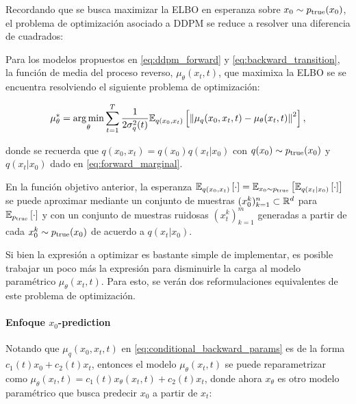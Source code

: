 Recordando que se busca maximizar la ELBO en esperanza sobre $x_0\sim p_{\operatorname{true}}(x_0)$, el problema de optimización asociado a DDPM se reduce a resolver una diferencia de cuadrados:

\begin{prop}
    \label{prop:mu_prediction}

    Para los modelos propuestos en \eqref{eq:ddpm_forward} y \eqref{eq:backward_transition}, la función de media del proceso reverso, $\mu_\theta(x_t,t)$, que maximixa la ELBO se se encuentra resolviendo el siguiente problema de optimización:

    \begin{equation*}
        \mu_\theta^* = \operatorname*{arg\,min}_{\theta} \sum_{t=1}^T \frac{1}{2\sigma_q^2(t)} \mathbb{E}_{q(x_0,x_t)}\left[\left\lVert \mu_q(x_0,x_t, t)-\mu_\theta(x_t,t) \right\rVert^2\right],
    \end{equation*}

    donde se recuerda que $q(x_0,x_t)=q(x_0)q(x_t|x_0)$ con $q(x_0)\sim p_{\operatorname{true}}(x_0)$ y $q(x_t|x_0)$ dado en \eqref{eq:forward_marginal}.
\end{prop}

En la función objetivo anterior, la esperanza $\mathbb{E}_{q(x_0,x_t)}\left[\cdot\right]=\mathbb{E}_{x_0\sim p_{\operatorname{true}}}\left[\mathbb{E}_{q(x_t|x_0)}\left[\cdot\right]\right]$ se puede aproximar mediante un conjunto de muestras $(x_0^k)_{k=1}^n\subset\mathbb{R}^d$ para $\mathbb{E}_{p_{\operatorname{true}}}\left[\cdot\right]$ y con un conjunto de muestras ruidosas $(x_t^k)_{k=1}^m$ generadas a partir de cada $x_0^k\sim p_{\operatorname{true}}(x_0)$ de acuerdo a $q(x_t|x_0)$.

Si bien la expresión a optimizar es bastante simple de implementar, es posible trabajar un poco más la expresión para disminuirle la carga al modelo paramétrico $\mu_\theta(x_t,t)$. Para esto, se verán dos reformulaciones equivalentes de este problema de optimización.

\paragraph{Enfoque \texorpdfstring{$x_0$}{x0}-prediction}

Notando que $\mu_q(x_0,x_t,t)$ en \eqref{eq:conditional_backward_params} es de la forma $c_1(t)x_0 + c_2(t)x_t$, entonces el modelo $\mu_\theta(x_t,t)$ se puede reparametrizar como $\mu_\theta(x_t,t)=c_1(t)x_\theta(x_t,t) + c_2(t)x_t$, donde ahora $x_\theta$ es otro modelo paramétrico que busca predecir $x_0$ a partir de $x_t$:

